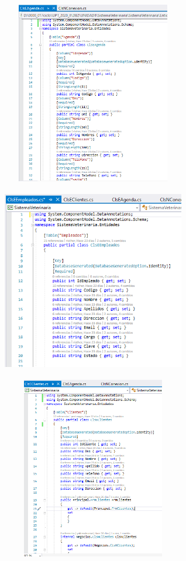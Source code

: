 \documentclass[12pt,a4paper,oneside]{book}
\begin{document}
\begin{enumerate}
\begin{enumerate}
\begin{enumerate}
							\begin{figure}[htb]
									\centering \includegraphics[width=8cm, height=8cm]{img/OR/primera.png}
							\end{figure}
							
							\begin{figure}[htb]
								\centering \includegraphics[width=8cm, height=8cm]{img/OR/segunda.png}
							\end{figure}
						
							\begin{figure}[htb]
								\centering \includegraphics[width=8cm, height=8cm]{img/OR/tercera.png}
							\end{figure}
				\newpage	
						

\end{enumerate}
\end{enumerate}
\end{enumerate}
\end{document}
